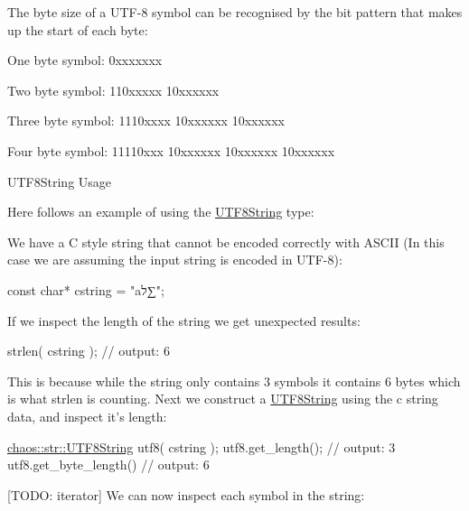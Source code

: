 The byte size of a U\-T\-F-\/8 symbol can be recognised by the bit pattern that makes up the start of each byte\-:


\begin{DoxyItemize}
\item One byte symbol\-: {\ttfamily 0xxxxxxx}
\item Two byte symbol\-: {\ttfamily 110xxxxx 10xxxxxx}
\item Three byte symbol\-: {\ttfamily 1110xxxx 10xxxxxx 10xxxxxx}
\item Four byte symbol\-: {\ttfamily 11110xxx 10xxxxxx 10xxxxxx 10xxxxxx}
\end{DoxyItemize}

\begin{DoxyParagraph}{U\-T\-F8\-String Usage}

\end{DoxyParagraph}
Here follows an example of using the \hyperlink{classchaos_1_1str_1_1_u_t_f8_string}{U\-T\-F8\-String} type\-:

We have a C style string that cannot be encoded correctly with A\-S\-C\-I\-I (In this case we are assuming the input string is encoded in U\-T\-F-\/8)\-:


\begin{DoxyCode}
\textcolor{keyword}{const} \textcolor{keywordtype}{char}* cstring = \textcolor{stringliteral}{"aל∑"};
\end{DoxyCode}


If we inspect the length of the string we get unexpected results\-:


\begin{DoxyCode}
strlen( cstring );
\textcolor{comment}{// output: 6}
\end{DoxyCode}


This is because while the string only contains 3 symbols it contains 6 bytes which is what {\ttfamily strlen} is counting. Next we construct a \hyperlink{classchaos_1_1str_1_1_u_t_f8_string}{U\-T\-F8\-String} using the c string data, and inspect it's length\-:


\begin{DoxyCode}
\hyperlink{classchaos_1_1str_1_1_u_t_f8_string}{chaos::str::UTF8String} utf8( cstring );
utf8.get\_length();
\textcolor{comment}{// output: 3}
utf8.get\_byte\_length()
\textcolor{comment}{// output: 6}
\end{DoxyCode}


\mbox{[}T\-O\-D\-O\-: iterator\mbox{]} We can now inspect each symbol in the string\-:


